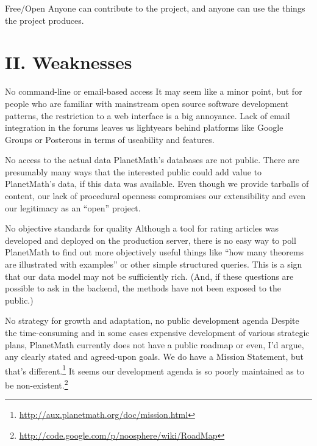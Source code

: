 \begin{paragraph}{Free/Open}
Anyone can contribute to the project, and anyone can use
the things the project produces.
\end{paragraph}

\section*{II. Weaknesses}

\begin{paragraph}{No command-line or email-based access}
It may seem like a minor point, but for people who are
familiar with mainstream open source software development
patterns, the restriction to a web interface is a big
annoyance.  Lack of email integration in the forums leaves
us lightyears behind platforms like Google Groups or
Posterous in terms of useability and features.
\end{paragraph}

\begin{paragraph}{No access to the actual data}
PlanetMath's databases are not public.  There are
presumably many ways that the interested public could add
value to PlanetMath's data, if this data was available.
Even though we provide tarballs of content, our lack of
procedural openness compromises our extensibility and even
our legitimacy as an ``open'' project.
\end{paragraph}

\begin{paragraph}{No objective standards for quality}
Although a tool for rating articles was developed and
deployed on the production server, there is no easy way to
poll PlanetMath to find out more objectively useful things
like ``how many theorems are illustrated with examples''
or other simple structured queries.  This is a sign that
our data model may not be sufficiently rich.  (And, if
these questions are possible to ask in the backend, the
methods have not been exposed to the public.)
\end{paragraph}

\begin{paragraph}{No strategy for growth and adaptation, no public development agenda}
Despite the time-consuming and in some cases expensive
development of various strategic plans, PlanetMath
currently does not have a public roadmap or even, I'd
argue, any clearly stated and agreed-upon goals.  We do
have a Mission Statement, but that's
different.\footnote{\url{http://aux.planetmath.org/doc/mission.html}}
It seems our development agenda is so poorly maintained as
to be
non-existent.\footnote{\url{http://code.google.com/p/noosphere/wiki/RoadMap}}
\end{paragraph}

